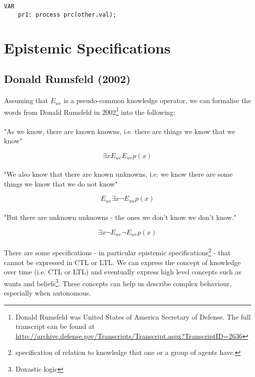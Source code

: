 \documentclass{article}
\theoremstyle{plain}
\theoremstyle{definition}
\begin{document}
\begin{multicols}{2}
\begin{lstlisting}
VAR
	pr1: process prc(other.val);
\end{lstlisting}

\section{Epistemic Specifications}

\subsection{Donald Rumsfeld (2002)}

\paragraph{} Assuming that $E_{we}$ is a pseudo-common knowledge operator, we can formalise the words from Donald Rumsfeld in 2002\footnote{Donald Rumsfeld was United States of America Secretary of Defense. The full transcript can be found at \url{http://archive.defense.gov/Transcripts/Transcript.aspx?TranscriptID=2636}} into the following:

\paragraph{} "As we know, there are known knowns, i.e. there are things we know that we know"

$$\exists x E_{we} E_{we} p(x)$$

\paragraph{} "We also know that there are known unknowns, i.e. we know there are some things we know that we do not know"

$$E_{we} \exists x \lnot E_{we} p(x)$$

\paragraph{} "But there are unknown unknowns - the ones we don't know we don't know."

$$\exists x \lnot E_{we} \lnot E_{we} p(x)$$

\paragraph{} There are some specifications - in particular epistemic specifications\footnote{specification of relation to knowledge that one or a group of agents have.} - that cannot be expressed in CTL or LTL. We can express the concept of knowledge over time (i.e. CTL or LTL) and eventually express high level concepts such as wants and beliefs\footnote{Doxastic logic}. These concepts can help us describe complex behaviour, especially when autonomous. 


\end{multicols}
\end{document}
